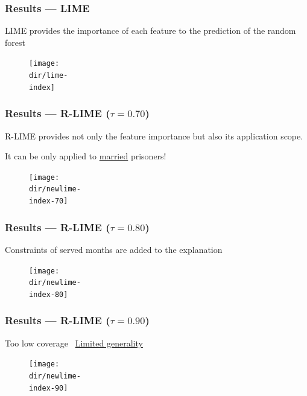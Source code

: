 \documentclass[aspectratio=169]{slide-ja}
\begin{document}
{%
\def\scale{0.42}

\subsubsection{Results --- LIME}
\begin{frame}{}
  LIME provides the importance of each feature to the prediction of the random forest
  \bigskip
  \begin{figure}[b]
    \hspace{-5em}
    \texttt{[image: \\dir/lime-\\index]}
  \end{figure}
\end{frame}

\subsubsection{Results --- R-LIME ($\tau=0.70$)}
\begin{frame}{}
  R-LIME provides not only the feature importance but also its application scope.

  It can be only applied to \underline{married} prisoners!
  \begin{figure}
    \hspace{-5em}
    \texttt{[image: \\dir/newlime-\\index-70]}
  \end{figure}
\end{frame}

\subsubsection{Results --- R-LIME ($\tau=0.80$)}
\begin{frame}{}
  Constraints of served months are added to the explanation

  \begin{figure}
    \hspace{-4.8em}
    \texttt{[image: \\dir/newlime-\\index-80]}
  \end{figure}
\end{frame}

\subsubsection{Results --- R-LIME ($\tau=0.90$)}
\begin{frame}{}
  Too low coverage \rightarrow~\underline{Limited generality}
  \begin{figure}
    \hspace{-2.3em}
    \texttt{[image: \\dir/newlime-\\index-90]}
  \end{figure}
\end{frame}
}
\end{document}
